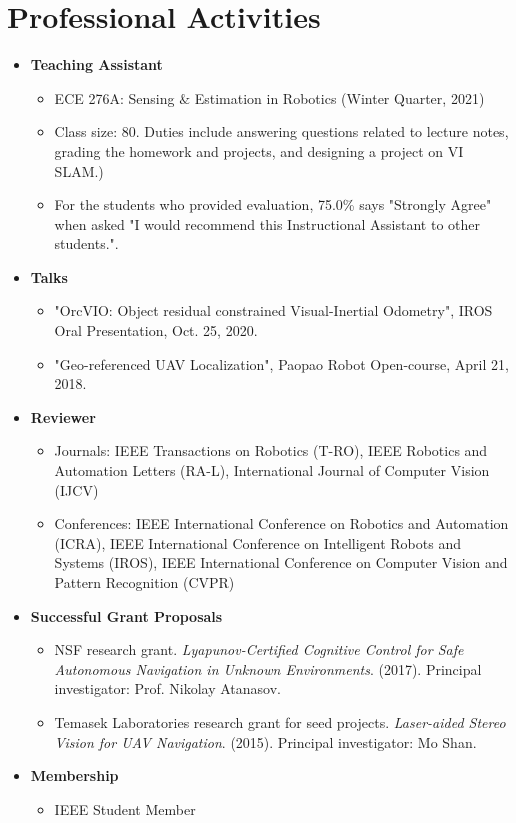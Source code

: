 \documentclass[letterpaper,11pt]{article}
\newcommand{\resumeItem}[1]{
  \item\small{
    {#1 \vspace{-2pt}}
  }
}
\newcommand{\resumeSubHeadingListStart}{\begin{itemize}[leftmargin=0.15in, label={}]}
\newcommand{\resumeSubHeadingListEnd}{\end{itemize}}
\newcommand{\resumeItemListStart}{\begin{itemize}}
\newcommand{\resumeItemListEnd}{\end{itemize}\vspace{-5pt}}
\begin{document}
\section{Professional Activities}
  \resumeSubHeadingListStart
  
  \resumeItem{\textbf{Teaching Assistant}}
      \resumeItemListStart
        \resumeItem{ECE 276A: Sensing $\&$ Estimation in Robotics (Winter Quarter, 2021)}
        \resumeItem{Class size: 80. Duties include answering questions related to lecture notes, grading the homework and projects, and designing a project on VI SLAM.)}
        \resumeItem{For the students who provided evaluation, 75.0\% says "Strongly Agree" when asked "I would recommend this Instructional Assistant to other students.".}
    \resumeItemListEnd
  
  \resumeItem{\textbf{Talks}}
      \resumeItemListStart
        \resumeItem{"OrcVIO: Object residual constrained Visual-Inertial Odometry", IROS Oral Presentation, Oct. 25, 2020.}
        \resumeItem{"Geo-referenced UAV Localization", Paopao Robot Open-course, April 21, 2018.}
    \resumeItemListEnd
  
  \resumeItem{\textbf{Reviewer}}
      \resumeItemListStart
        \resumeItem{Journals: IEEE Transactions on Robotics (T-RO), IEEE Robotics and Automation Letters (RA-L), International Journal of Computer Vision (IJCV)}
        \resumeItem{Conferences: IEEE International Conference on Robotics and Automation (ICRA), IEEE International Conference on Intelligent Robots and Systems (IROS), IEEE International Conference on Computer Vision and Pattern Recognition (CVPR)}
    \resumeItemListEnd
    
  \resumeItem{\textbf{Successful Grant Proposals}}
      \resumeItemListStart
        \resumeItem{NSF research grant. \textit{Lyapunov-Certified Cognitive Control for Safe
Autonomous Navigation in Unknown Environments}. (2017). Principal investigator: Prof. Nikolay Atanasov.}
        \resumeItem{Temasek Laboratories research grant for seed projects. \textit{Laser-aided Stereo Vision for UAV Navigation}. (2015). Principal investigator: Mo Shan.}
    \resumeItemListEnd
    
\resumeItem{\textbf{Membership}}
    \resumeItemListStart
     \resumeItem{IEEE Student Member}
    \resumeItemListEnd
    
  \resumeSubHeadingListEnd

\end{document}
